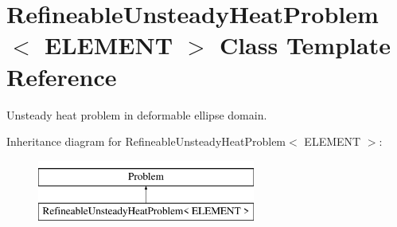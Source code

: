 \hypertarget{classRefineableUnsteadyHeatProblem}{}\section{Refineable\+Unsteady\+Heat\+Problem$<$ E\+L\+E\+M\+E\+NT $>$ Class Template Reference}
\label{classRefineableUnsteadyHeatProblem}


Unsteady heat problem in deformable ellipse domain.  


Inheritance diagram for Refineable\+Unsteady\+Heat\+Problem$<$ E\+L\+E\+M\+E\+NT $>$\+:\begin{figure}[H]
\begin{center}
\leavevmode
\includegraphics[height=2.000000cm]{classRefineableUnsteadyHeatProblem}
\end{center}
\end{figure}
